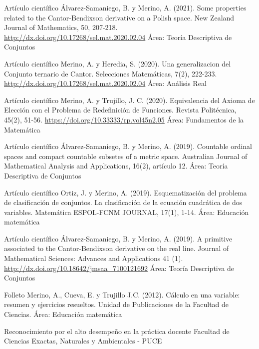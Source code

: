\documentclass[
	a4paper,
	maincolor=cvblue!70!blue,
	sidecolor=gray!30,
	sectioncolor=cvblue!70!blue,
    sidebarwidth=7.5cm,
	topbottommargin=20pt,
	leftrightmargin=20pt,
]{fortysecondscv}
\begin{document}
    {Artículo científico}
    {Álvarez-Samaniego, B. y Merino, A. (2021). Some properties related to the Cantor-Bendixson derivative on a Polish space. New Zealand Journal of Mathematics, 50, 207-218.}     {\url{http://dx.doi.org/10.17268/sel.mat.2020.02.04}}
    {Área: Teoría Descriptiva de Conjuntos}
    
    {Artículo científico}
    {Merino, A. y Heredia, S. (2020). Una generalizacion del Conjunto ternario de Cantor. Selecciones Matemáticas, 7(2), 222-233.}     {\url{http://dx.doi.org/10.17268/sel.mat.2020.02.04}}
    {Área: Análisis Real}
    
    {Artículo científico}
    {Merino, A. y Trujillo, J. C. (2020). Equivalencia del Axioma de Elección con el Problema de Redefinición de Funciones. Revista Politécnica, 45(2), 51-56.}     {\url{https://doi.org/10.33333/rp.vol45n2.05}}
    {Área: Fundamentos de la Matemática}
    
    {Artículo científico}
    {Álvarez-Samaniego, B. y Merino, A. (2019). Countable ordinal spaces and compact countable subsetes of a metric space. Australian Journal of Mathematical Analysis and Applications, 16(2), artículo 12.}
    {}
    {Área: Teoría Descriptiva de Conjuntos}
    
    {Artículo científico}
    {Ortiz, J. y Merino, A. (2019). Esquematización del problema de clasificación de conjuntos. La clasificación de la ecuación cuadrática de dos variables. Matemática ESPOL-FCNM JOURNAL, 17(1), 1-14.}
    {}
    {Área: Educación matemática}
    
    {Artículo científico}
    {Álvarez-Samaniego, B. y Merino, A. (2019). A primitive associated to the Cantor-Bendixson derivative on the real line. Journal of Mathematical Sciences: Advances and Applications 41 (1).}     
    {\url{http://dx.doi.org/10.18642/jmsaa_7100121692}}
    {Área: Teoría Descriptiva de Conjuntos}
    
    {Folleto}
    {Merino, A., Cueva, E. y Trujillo J.C. (2012). Cálculo en una variable: resumen y ejercicios resueltos. Unidad de Publicaciones de la Facultad de Ciencias.}
    {}
    {Área: Educación matemática}
    


    {Reconocimiento por el alto desempeño en la práctica docente}
    {Facultad de Ciencias Exactas, Naturales y Ambientales - PUCE}
    {}
\end{document}
